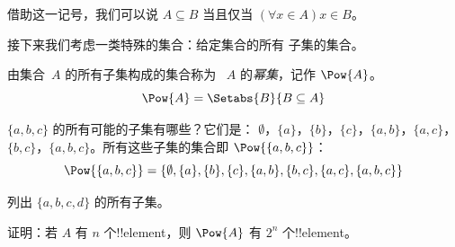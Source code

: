 \documentclass[../../../include/open-logic-section]{subfiles}
\begin{document}
借助这一记号，我们可以说 $A \subseteq B$ 当且仅当 $(\forall
x \in A)x \in B$。

接下来我们考虑一类特殊的集合：给定集合的所有
子集的集合。

\begin{defn}[幂集]
由集合~$A$ 的所有子集构成的集合称为
~$A$ 的\emph{幂集}，记作 $\Pow{A}$。
  \[
    \Pow{A} = \Setabs{B}{B \subseteq A}
  \]
\end{defn}

\begin{ex}
$\{ a, b, c \}$ 的所有可能的子集有哪些？它们是：
$\emptyset$，$\{a \}$，$\{b\}$，$\{c\}$，$\{a, b\}$，$\{a, c\}$，$\{b,
c\}$，$\{a, b, c\}$。所有这些子集的集合即
$\Pow{\{a,b,c\}}$：
\[
\Pow{\{ a, b, c \}} = \{\emptyset, \{a \}, \{b\}, \{c\}, \{a, b\},
\{b, c\}, \{a, c\}, \{a, b, c\}\}
\]
\end{ex}

\begin{prob}
列出 $\{a, b, c, d\}$ 的所有子集。
\end{prob}

\begin{prob}
证明：若 $A$ 有 $n$ 个!!{element}，则 $\Pow{A}$ 有 $2^n$
个!!{element}。
\end{prob}
\end{document}
